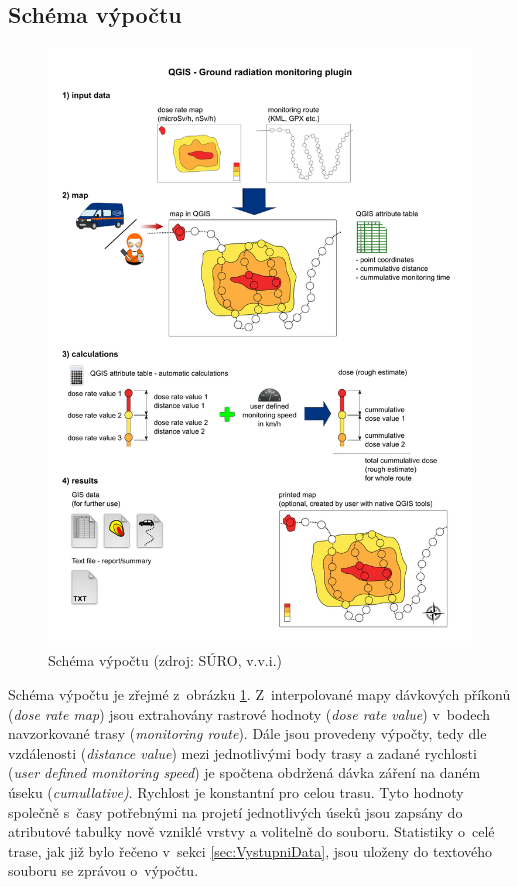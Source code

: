 \subsection{Schéma výpočtu}
\begin{figure}[H]
    \centering
    \includegraphics[scale=0.4]{./pictures/computation_scheme.png}
      	\caption[Schéma výpočtu]{Schéma výpočtu (zdroj: SÚRO, v.v.i.)}
    	\label{fig:SchemeOfComputation}
\end{figure}

Schéma výpočtu je zřejmé z~obrázku \ref{fig:SchemeOfComputation}. Z~interpolované mapy dávkových příkonů (\textit{dose rate map}) jsou extrahovány rastrové hodnoty (\textit{dose rate value}) v~bodech navzorkované trasy (\textit{monitoring route}). Dále jsou provedeny výpočty, tedy dle vzdálenosti (\textit{distance value}) mezi jednotlivými body trasy a zadané rychlosti (\textit{user defined monitoring speed}) je spočtena obdržená dávka záření na daném úseku (\textit{cumullative)}. Rychlost je konstantní pro celou trasu. Tyto hodnoty společně s~časy potřebnými na projetí jednotlivých úseků jsou zapsány do atributové tabulky nově vzniklé vrstvy a volitelně do  souboru. Statistiky o~celé trase, jak již bylo řečeno v~sekci \ref{sec:VystupniData}, jsou uloženy do textového souboru se zprávou o~výpočtu.

